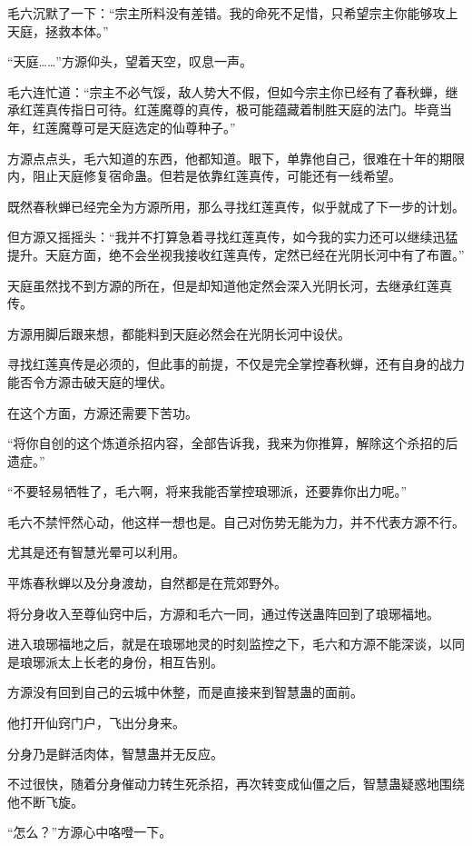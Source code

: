 \begin{this_body}
毛六沉默了一下：“宗主所料没有差错。我的命死不足惜，只希望宗主你能够攻上天庭，拯救本体。”

“天庭……”方源仰头，望着天空，叹息一声。

毛六连忙道：“宗主不必气馁，敌人势大不假，但如今宗主你已经有了春秋蝉，继承红莲真传指日可待。红莲魔尊的真传，极可能蕴藏着制胜天庭的法门。毕竟当年，红莲魔尊可是天庭选定的仙尊种子。”

方源点点头，毛六知道的东西，他都知道。眼下，单靠他自己，很难在十年的期限内，阻止天庭修复宿命蛊。但若是依靠红莲真传，可能还有一线希望。

既然春秋蝉已经完全为方源所用，那么寻找红莲真传，似乎就成了下一步的计划。

但方源又摇摇头：“我并不打算急着寻找红莲真传，如今我的实力还可以继续迅猛提升。天庭方面，绝不会坐视我接收红莲真传，定然已经在光阴长河中有了布置。”

天庭虽然找不到方源的所在，但是却知道他定然会深入光阴长河，去继承红莲真传。

方源用脚后跟来想，都能料到天庭必然会在光阴长河中设伏。

寻找红莲真传是必须的，但此事的前提，不仅是完全掌控春秋蝉，还有自身的战力能否令方源击破天庭的埋伏。

在这个方面，方源还需要下苦功。

“将你自创的这个炼道杀招内容，全部告诉我，我来为你推算，解除这个杀招的后遗症。”

“不要轻易牺牲了，毛六啊，将来我能否掌控琅琊派，还要靠你出力呢。”

毛六不禁怦然心动，他这样一想也是。自己对伤势无能为力，并不代表方源不行。

尤其是还有智慧光晕可以利用。

平炼春秋蝉以及分身渡劫，自然都是在荒郊野外。

将分身收入至尊仙窍中后，方源和毛六一同，通过传送蛊阵回到了琅琊福地。

进入琅琊福地之后，就是在琅琊地灵的时刻监控之下，毛六和方源不能深谈，以同是琅琊派太上长老的身份，相互告别。

方源没有回到自己的云城中休整，而是直接来到智慧蛊的面前。

他打开仙窍门户，飞出分身来。

分身乃是鲜活肉体，智慧蛊并无反应。

不过很快，随着分身催动力转生死杀招，再次转变成仙僵之后，智慧蛊疑惑地围绕他不断飞旋。

“怎么？”方源心中咯噔一下。


\end{this_body}
